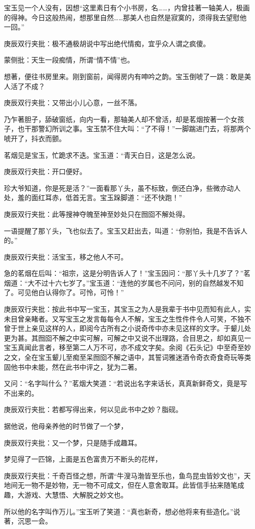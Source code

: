 \begin{parag}
    宝玉见一个人没有，因想“这里素日有个小书房，名……，内曾挂著一轴美人，极画的得神。今日这般热闹，想那里自然……那美人也自然是寂寞的，须得我去望慰他一回。”\begin{note}庚辰双行夹批：极不通极胡说中写出绝代情痴，宜乎众人谓之疯傻。\end{note}\begin{note}蒙侧批：天生一段痴情，所谓“情不情”也。\end{note}想著，便往书房里来。刚到窗前，闻得房内有呻吟之韵。宝玉倒唬了一跳：敢是美人活了不成？\begin{note}庚辰双行夹批：又带出小儿心意，一丝不落。\end{note}乃乍著胆子，舔破窗纸，向内一看，那轴美人却不曾活，却是茗烟按著一个女孩子，也干那警幻所训之事。宝玉禁不住大叫：“了不得！”一脚踹进门去，将那两个唬开了，抖衣而颤。
\end{parag}


\begin{parag}
    茗烟见是宝玉，忙跪求不迭。宝玉道：“青天白日，这是怎么说。\begin{note}庚辰双行夹批：开口便好。\end{note}珍大爷知道，你是死是活？”一面看那丫头，虽不标致，倒还白净，些微亦动人处，羞的面红耳赤，低首无言。宝玉跺脚道：“还不快跑！”\begin{note}庚辰双行夹批：此等搜神夺魄至神至妙处只在囫囵不解处得。\end{note}一语提醒了那丫头，飞也似去了。宝玉又赶出去，叫道：“你别怕，我是不告诉人的。”\begin{note}庚辰双行夹批：活宝玉，移之他人不可。\end{note}急的茗烟在后叫：“祖宗，这是分明告诉人了！”宝玉因问：“那丫头十几岁了？”茗烟道：“大不过十六七岁了。”宝玉道：“连他的岁属也不问问，别的自然越发不知了。可见他白认得你了。可怜，可怜！”\begin{note}庚辰双行夹批：按此书中写一宝玉，其宝玉之为人是我辈于书中见而知有此人，实未目曾亲睹者。又写宝玉之发言每每令人不解，宝玉之生性件件令人可笑，不独不曾于世上亲见这样的人，即阅今古所有之小说奇传中亦未见这样的文字。于颦儿处更为甚。其囫囵不解之中实可解，可解之中又说不出理路，合目思之，却如真见一宝玉真闻此言者，移至第二人万不可，亦不成文字矣。余阅《石头记》中至奇至妙之文，全在宝玉颦儿至痴至呆囫囵不解之语中，其誓词雅迷酒令奇衣奇食奇玩等类固他书中未能，然在此书中评之，犹为二著。\end{note}又问：“名字叫什么？”茗烟大笑道：“若说出名字来话长，真真新鲜奇文，竟是写不出来的。\begin{note}庚辰双行夹批：若都写得出来，何以见此书中之妙？脂砚。\end{note}据他说，他母亲养他的时节做了一个梦，\begin{note}庚辰双行夹批：又一个梦，只是随手成趣耳。\end{note}梦见得了一匹锦，上面是五色富贵万不断头的花样，\begin{note}庚辰双行夹批：千奇百怪之想，所谓“牛溲马渤皆至乐也，鱼鸟昆虫皆妙文也”，天地间无一物不是妙物，无一物不可成文，但在人意舍取耳。此皆信手拈来随笔成趣，大游戏、大慧悟、大解脱之妙文也。\end{note}所以他的名字叫作万儿。”宝玉听了笑道：“真也新奇，想必他将来有些造化。”说著，沉思一会。
\end{parag}



